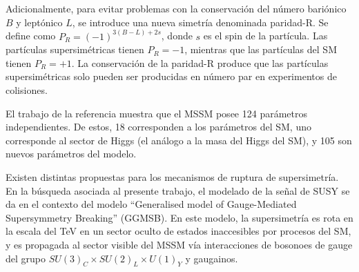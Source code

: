 
 





Adicionalmente, para evitar problemas con la conservación del número bariónico $B$ y leptónico $L$, se introduce una nueva simetría denominada paridad-R. Se define como $P_{R}=(-1)^{3(B-L)+2s}$, donde $s$ es el spin de la partícula. Las partículas supersimétricas tienen $P_{R}=-1$, mientras que las partículas del SM tienen $P_{R}=+1$. La conservación de la paridad-R produce que las partículas supersimétricas solo pueden ser producidas en número par en experimentos de colisiones.

El trabajo de la referencia \cite{Dimopoulos:1995ju} muestra que el MSSM posee 124 parámetros independientes. De estos, 18 corresponden a los parámetros del SM, uno corresponde al sector de Higgs (el análogo a la masa del Higgs del SM), y 105 son nuevos parámetros del modelo. 

Existen distintas propuestas para los mecanismos de ruptura de supersimetría. En la búsqueda asociada al presente trabajo, el modelado de la señal de SUSY se da en el contexto del modelo “Generalised model of Gauge-Mediated Supersymmetry Breaking” (GGMSB). En este modelo, la supersimetría es rota en la escala del TeV en un sector oculto de estados inaccesibles por procesos del SM, y es propagada al sector visible del MSSM vía interacciones de bosonoes de gauge del grupo $SU(3)_{C} \times SU(2)_{L} \times U(1)_{Y}$ y gaugainos.

